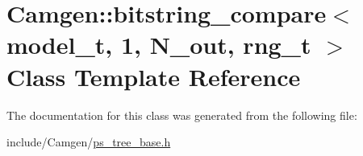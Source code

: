 \hypertarget{a00025}{}\section{Camgen\+:\+:bitstring\+\_\+compare$<$ model\+\_\+t, 1, N\+\_\+out, rng\+\_\+t $>$ Class Template Reference}
\label{a00025}


The documentation for this class was generated from the following file\+:\begin{DoxyCompactItemize}
\item 
include/\+Camgen/\hyperlink{a00745}{ps\+\_\+tree\+\_\+base.\+h}\end{DoxyCompactItemize}
